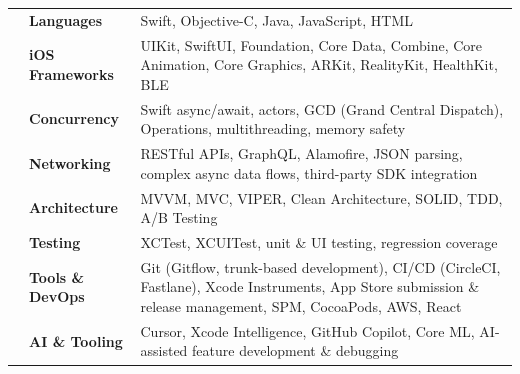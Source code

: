\renewcommand{\arraystretch}{1.4}

\begin{tabular}{p{0em} p{9em} p{34em}}
& \textbf{Languages}       & Swift, Objective-C, Java, JavaScript, HTML \\
& \textbf{iOS Frameworks}  & UIKit, SwiftUI, Foundation, Core Data, Combine, Core Animation, Core Graphics, ARKit, RealityKit, HealthKit, BLE \\
& \textbf{Concurrency}     & Swift async/await, actors, GCD (Grand Central Dispatch), Operations, multithreading, memory safety \\
& \textbf{Networking}      & RESTful APIs, GraphQL, Alamofire, JSON parsing, complex async data flows, third-party SDK integration \\
& \textbf{Architecture}    & MVVM, MVC, VIPER, Clean Architecture, SOLID, TDD, A/B Testing \\
& \textbf{Testing}         & XCTest, XCUITest, unit \& UI testing, regression coverage \\
& \textbf{Tools \& DevOps} & Git (Gitflow, trunk-based development), CI/CD (CircleCI, Fastlane), Xcode Instruments, App Store submission \& release management, SPM, CocoaPods, AWS, React \\
& \textbf{AI \& Tooling}    & Cursor, Xcode Intelligence, GitHub Copilot, Core ML, AI-assisted feature development \& debugging \\
\end{tabular}
